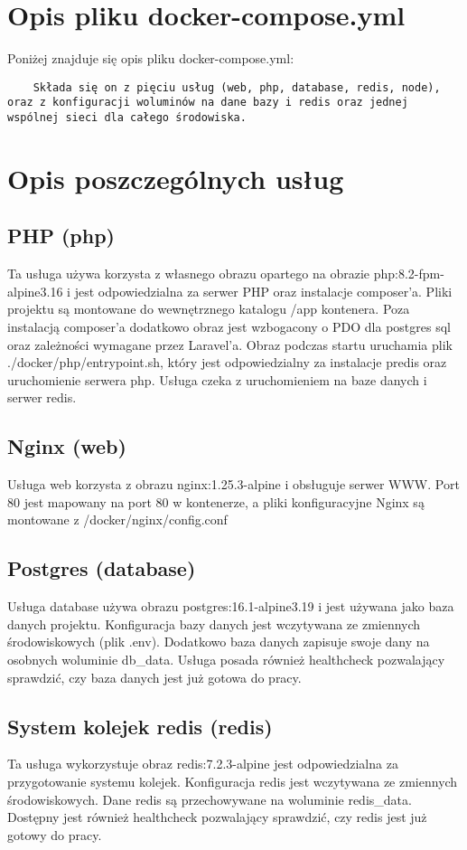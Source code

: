 \documentclass{article}
\begin{document}
\section{Opis pliku docker-compose.yml}
Poniżej znajduje się opis pliku docker-compose.yml:

\begin{verbatim}
    Składa się on z pięciu usług (web, php, database, redis, node), oraz z konfiguracji woluminów na dane bazy i redis oraz jednej wspólnej sieci dla całego środowiska.
\end{verbatim}

\section{Opis poszczególnych usług}
\subsection{PHP (php)}
Ta usługa używa korzysta z własnego obrazu opartego na obrazie php:8.2-fpm-alpine3.16 i jest odpowiedzialna za serwer PHP oraz instalacje composer'a. Pliki projektu są montowane do wewnętrznego katalogu /app kontenera. Poza instalacją composer'a dodatkowo obraz jest wzbogacony o PDO dla postgres sql oraz zależności wymagane przez Laravel'a. Obraz podczas startu uruchamia plik ./docker/php/entrypoint.sh, który jest odpowiedzialny za instalacje predis oraz uruchomienie serwera php. Usługa czeka z uruchomieniem na baze danych i serwer redis.

\subsection{Nginx (web)}
Usługa web korzysta z obrazu nginx:1.25.3-alpine i obsługuje serwer WWW. Port 80 jest mapowany na port 80 w kontenerze, a pliki konfiguracyjne Nginx są montowane z /docker/nginx/config.conf

\subsection{Postgres (database)}
Usługa database używa obrazu postgres:16.1-alpine3.19 i jest używana jako baza danych projektu. Konfiguracja bazy danych jest wczytywana ze zmiennych środowiskowych (plik .env). Dodatkowo baza danych zapisuje swoje dany na osobnych woluminie db\_data. Usługa posada również healthcheck pozwalający sprawdzić, czy baza danych jest już gotowa do pracy.

\subsection{System kolejek redis (redis)}
Ta usługa wykorzystuje obraz redis:7.2.3-alpine jest odpowiedzialna za przygotowanie systemu kolejek. Konfiguracja redis jest wczytywana ze zmiennych środowiskowych. Dane redis są przechowywane na woluminie redis\_data. Dostępny jest również healthcheck pozwalający sprawdzić, czy redis jest już gotowy do pracy.
\end{document}
